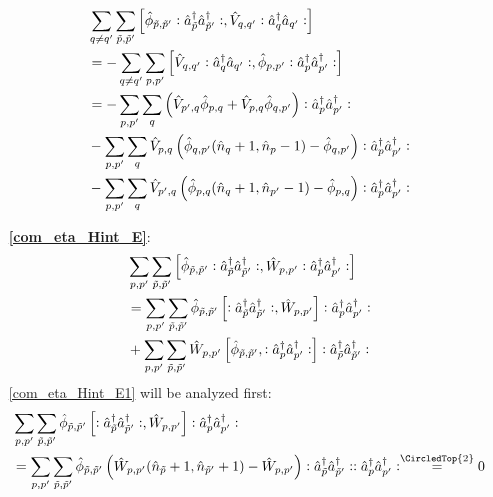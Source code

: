 \begin{appendix}
\begin{itemize}
\begin{subequations}
\begin{align}
&\sum\limits_{q\neq q^\prime}\sum\limits_{\tilde p,\tilde p^\prime} \left[\hat\phi_{\tilde p,\tilde p^\prime}\vcentcolon\hat a^\dagger_{\tilde p}\hat a^\dagger_{\tilde p^\prime}\vcentcolon,\hat V_{q,q^\prime}\vcentcolon\hat a^\dagger_q\hat a_{q^\prime}\vcentcolon\right]\\
&=-\sum\limits_{q\neq q^\prime}\sum\limits_{ p, p^\prime} \left[\hat V_{q,q^\prime}\vcentcolon\hat a^\dagger_q\hat a_{q^\prime}\vcentcolon,\hat\phi_{ p, p^\prime}\vcentcolon\hat a^\dagger_{ p}\hat a^\dagger_{ p^\prime}\vcentcolon\right]\\
&=-\sum\limits_{p, p^\prime}\sum\limits_{q}\left(\hat V_{ p^\prime, q}\hat \phi_{p,q}+\hat V_{ p,q}\hat \phi_{q,p^\prime}\right)\vcentcolon\hat a^\dagger_p\hat a^\dagger_{p^\prime}\vcentcolon\\
&-\sum\limits_{p, p^\prime}\sum\limits_{ q} \hat V_{ p,q}\left(\hat \phi_{q,p^\prime}(\hat n_{q}+1,\hat n_p-1)- \hat \phi_{q,p^\prime}\right)\vcentcolon\hat a^\dagger_p\hat a^\dagger_{p^\prime}\vcentcolon\nonumber \\
&-\sum\limits_{p, p^\prime}\sum\limits_{ q} \hat V_{ p^\prime,q}\left(\hat \phi_{p,q}(\hat n_{q}+1,\hat n_{p^\prime}-1)- \hat \phi_{p,q}\right)\vcentcolon\hat a^\dagger_p\hat a^\dagger_{p^\prime}\vcentcolon\nonumber
\end{align}
\end{subequations}
\item[\textbf{\ref{com_eta_Hint_E}}:] 
\begin{subequations}
\begin{align}
&\sum\limits_{p, p^\prime}\sum\limits_{\tilde p,\tilde p^\prime} \left[\hat\phi_{\tilde p,\tilde p^\prime}\vcentcolon\hat a^\dagger_{\tilde p}\hat a^\dagger_{\tilde p^\prime}\vcentcolon,\hat W_{p,p^\prime}\vcentcolon\hat a^\dagger_p\hat a^\dagger_{p^\prime}\vcentcolon\right]\nonumber\\
&=\sum\limits_{p, p^\prime}\sum\limits_{\tilde p,\tilde p^\prime} \hat\phi_{\tilde p,\tilde p^\prime}\left[\vcentcolon\hat a^\dagger_{\tilde p}\hat a^\dagger_{\tilde p^\prime}\vcentcolon,\hat W_{p,p^\prime}\right]\vcentcolon\hat a^\dagger_p\hat a^\dagger_{p^\prime}\vcentcolon\label{com_eta_Hint_E1}\\
&+\sum\limits_{p, p^\prime}\sum\limits_{\tilde p,\tilde p^\prime}\hat W_{p,p^\prime} \left[\hat\phi_{\tilde p,\tilde p^\prime},\vcentcolon\hat a^\dagger_p\hat a^\dagger_{p^\prime}\vcentcolon\right]\vcentcolon\hat a^\dagger_{\tilde p}\hat a^\dagger_{\tilde p^\prime}\vcentcolon\label{com_eta_Hint_E2}
\end{align}
\end{subequations}
\ref{com_eta_Hint_E1} will be analyzed first:
\begin{align}
&\Sum_{p, p^\prime}\Sum_{\tilde p,\tilde p^\prime} \hat\phi_{\tilde p,\tilde p^\prime}\left[\NO\CR_{\tilde p}\CR_{\tilde p^\prime}\NO,\hat W_{p,p^\prime}\right]\NO\CR_p\CR_{p^\prime}\NO\nonumber\\
&=\Sum_{p, p^\prime}\Sum_{\tilde p,\tilde p^\prime} \hat\phi_{\tilde p,\tilde p^\prime}\left(\hat W_{p,p^\prime}(\hat n_{\tilde p}+1,\hat n_{\tilde p^\prime}+1)-\hat W_{p,p^\prime}\right)\NO\CR_{\tilde p}\CR_{\tilde p^\prime}\NO\NO\CR_p\CR_{p^\prime}\NO\overset{\CircledTop{2}}{=}0

\end{align}
\end{itemize}
\end{appendix}
